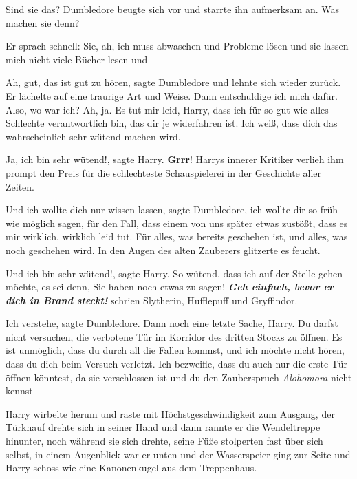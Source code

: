 \glqq Sind sie das?\grqq{} Dumbledore beugte sich vor und starrte ihn aufmerksam
an. \glqq Was machen sie denn?\grqq{}

Er sprach schnell: \glqq Sie, ah, ich muss abwaschen und Probleme lösen und sie
lassen mich nicht viele Bücher lesen und -\grqq{}

\glqq Ah, gut, das ist gut zu hören\grqq{}, sagte Dumbledore und lehnte sich
wieder zurück. Er lächelte auf eine traurige Art und Weise. \glqq Dann
entschuldige ich mich dafür. Also, wo war ich? Ah, ja. Es tut mir leid, Harry,
dass ich für so gut wie alles Schlechte verantwortlich bin, das dir je
widerfahren ist. Ich weiß, dass dich das wahrscheinlich sehr wütend machen
wird.\grqq{}

\glqq Ja, ich bin sehr wütend!\grqq{}, sagte Harry. \glqq \textbf{Grrr}!\grqq{}
Harrys innerer Kritiker verlieh ihm prompt den Preis für die schlechteste
Schauspielerei in der Geschichte aller Zeiten.

\glqq Und ich wollte dich nur wissen lassen\grqq{}, sagte Dumbledore, \glqq ich
wollte dir so früh wie möglich sagen, für den Fall, dass einem von uns später
etwas zustößt, dass es mir wirklich, wirklich leid tut. Für alles, was bereits
geschehen ist, und alles, was noch geschehen wird.\grqq{} In den Augen des alten
Zauberers glitzerte es feucht.

\glqq Und ich bin sehr wütend!\grqq{}, sagte Harry. \glqq So wütend, dass ich
auf der Stelle gehen möchte, es sei denn, Sie haben noch etwas zu sagen!\grqq{}
\textbf{\emph{Geh einfach, bevor er dich in Brand steckt!}} schrien Slytherin,
Hufflepuff und Gryffindor.

\glqq Ich verstehe\grqq{}, sagte Dumbledore. \glqq Dann noch eine letzte Sache,
Harry. Du darfst nicht versuchen, die verbotene Tür im Korridor des dritten
Stocks zu öffnen. Es ist unmöglich, dass du durch all die Fallen kommst, und ich
möchte nicht hören, dass du dich beim Versuch verletzt. Ich bezweifle, dass du
auch nur die erste Tür öffnen könntest, da sie verschlossen ist und du den
Zauberspruch \emph{Alohomora} nicht kennst -\grqq{}

Harry wirbelte herum und raste mit Höchstgeschwindigkeit zum Ausgang, der
Türknauf drehte sich in seiner Hand und dann rannte er die Wendeltreppe
hinunter, noch während sie sich drehte, seine Füße stolperten fast über sich
selbst, in einem Augenblick war er unten und der Wasserspeier ging zur Seite und
Harry schoss wie eine Kanonenkugel aus dem Treppenhaus.

